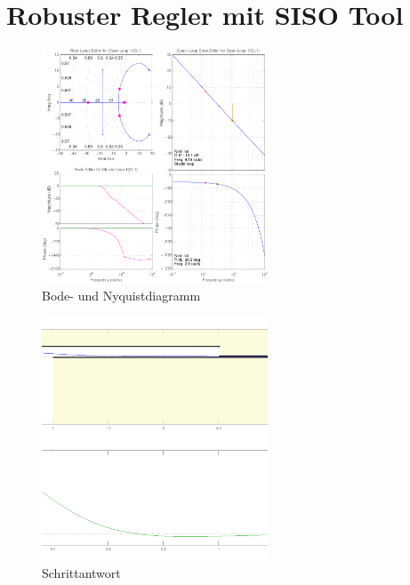 \section{Robuster Regler mit SISO Tool}
\begin{figure}[h!]
    \centering
    \includegraphics[width=0.6\textwidth]{07/diag_siso.pdf}
    \caption{Bode- und Nyquistdiagramm}
    \label{fig:07a}
\end{figure}
\begin{figure}[h!]
    \centering
    \includegraphics[width=0.6\textwidth]{07/step_siso.pdf}
    \caption{Schrittantwort}
    \label{fig:07b}
\end{figure}
